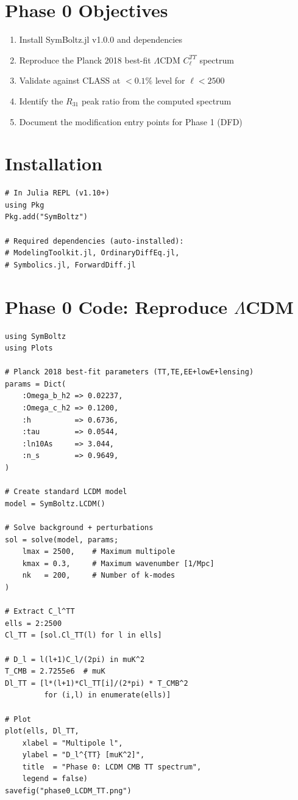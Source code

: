 \documentclass[11pt,a4paper]{article}
\begin{document}
\section{Phase 0 Objectives}

\begin{enumerate}
\item Install SymBoltz.jl v1.0.0 and dependencies
\item Reproduce the Planck 2018 best-fit $\Lambda$CDM $C_\ell^{TT}$ spectrum
\item Validate against CLASS at $< 0.1\%$ level for $\ell < 2500$
\item Identify the $R_{31}$ peak ratio from the computed spectrum
\item Document the modification entry points for Phase 1 (DFD)
\end{enumerate}

\section{Installation}

\begin{lstlisting}[caption={SymBoltz.jl installation}]
# In Julia REPL (v1.10+)
using Pkg
Pkg.add("SymBoltz")

# Required dependencies (auto-installed):
# ModelingToolkit.jl, OrdinaryDiffEq.jl,
# Symbolics.jl, ForwardDiff.jl
\end{lstlisting}

\section{Phase 0 Code: Reproduce $\Lambda$CDM}

\begin{lstlisting}[caption={Phase 0: Reproduce Planck 2018 best-fit LCDM}]
using SymBoltz
using Plots

# Planck 2018 best-fit parameters (TT,TE,EE+lowE+lensing)
params = Dict(
    :Omega_b_h2 => 0.02237,
    :Omega_c_h2 => 0.1200,
    :h          => 0.6736,
    :tau        => 0.0544,
    :ln10As     => 3.044,
    :n_s        => 0.9649,
)

# Create standard LCDM model
model = SymBoltz.LCDM()

# Solve background + perturbations
sol = solve(model, params;
    lmax = 2500,    # Maximum multipole
    kmax = 0.3,     # Maximum wavenumber [1/Mpc]
    nk   = 200,     # Number of k-modes
)

# Extract C_l^TT
ells = 2:2500
Cl_TT = [sol.Cl_TT(l) for l in ells]

# D_l = l(l+1)C_l/(2pi) in muK^2
T_CMB = 2.7255e6  # muK
Dl_TT = [l*(l+1)*Cl_TT[i]/(2*pi) * T_CMB^2
         for (i,l) in enumerate(ells)]

# Plot
plot(ells, Dl_TT,
    xlabel = "Multipole l",
    ylabel = "D_l^{TT} [muK^2]",
    title  = "Phase 0: LCDM CMB TT spectrum",
    legend = false)
savefig("phase0_LCDM_TT.png")
\end{lstlisting}
\end{document}
